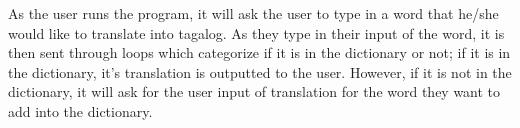 As the user runs the program, it will ask the user to type in a word that he/she would like to translate into tagalog. As they type in their input of the word, it is then sent through loops which categorize if it is in the dictionary or not; if it is in the dictionary, it's translation is outputted to the user. However, if it is not in the dictionary, it will ask for the user input of translation for the word they want to add into the dictionary. 